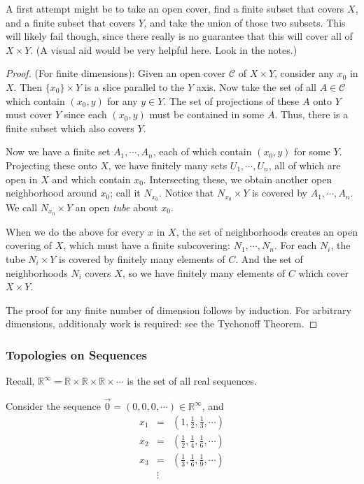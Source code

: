 \documentclass[12pt]{report}
\newcommand{\reals}{\mathbb{R}}
\begin{document}

A first attempt might be to take an open cover, find a finite subset that 
covers $X$, and a finite subset that covers $Y$, and take the union of those
two subsets. This will likely fail though, since there really is no guarantee
that this will cover all of $X \times Y$. (A
visual aid would be very helpful here. Look in the notes.)\\

\begin{proof}
(For finite dimensions): Given an open cover $\mathcal{C}$ of $X \times Y$, consider any $x_0$ in $X$. 
Then $\{x_0\} \times Y$ is a slice parallel to the $Y$ axis. Now take the set
of all $A \in \mathcal{C}$ which contain $(x_0,y)$ for any $y \in Y$. The set
of projections of these $A$ onto $Y$ must cover $Y$ since each $(x_0,y)$ must be
contained in some $A$.  Thus, there is a finite subset which also covers $Y$.

Now we have a finite set $A_1, \cdots, A_n$, each of which contain $(x_0,y)$
for some $Y$. Projecting these onto $X$, we have finitely many sets $U_1,
\cdots, U_n$, all of which are open in $X$ and which contain $x_0$.
Intersecting these, we obtain another open neighborhood around $x_0$; call it
$N_{x_0}$. Notice that $N_{x_0} \times Y$ is covered by $A_1, \cdots, A_n$. We
call $N_{x_0} \times Y$ an open  {\em tube} about $x_0$.

When we do the above for every $x$ in $X$, the set of neighborhoods creates an
open covering of $X$,
which must have a finite subcovering: $N_1, \cdots, N_n$. For each $N_i$, the
tube 
$N_i \times Y$ is covered by finitely many elements of $C$. And the set
of neighborhoods $N_i$ covers $X$, so we have finitely many elements of $C$
which cover $X \times Y$.

The proof for any finite number of dimension follows by induction. For
arbitrary dimensions, additionaly work is required: see the Tychonoff Theorem.
\end{proof}

\subsubsection{Topologies on Sequences}

Recall, $\reals^\infty = \reals \times \reals \times \reals \times \cdots$ is
the set of all real sequences.

Consider the sequence $\vec{0} = (0, 0, 0, \cdots) \in
\reals^\infty$, and 
\begin{eqnarray*}
x_1 & = & (1, \frac{1}{2}, \frac{1}{3}, \cdots)\\
x_2 & = & (\frac{1}{2}, \frac{1}{4}, \frac{1}{6}, \cdots)\\
x_3 & = & (\frac{1}{3}, \frac{1}{6}, \frac{1}{9}, \cdots)\\
    & \vdots &
\end{eqnarray*}
\end{document}
